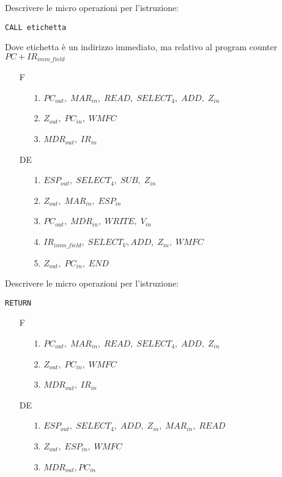 \documentclass[a4paper]{article}
\theoremstyle{break}
\theoremstyle{break}
\theoremstyle{break}
\theoremstyle{break}
\begin{document}
\begin{exercise}
	Descrivere le micro operazioni per l'istruzione:
	\begin{center}
		\texttt{CALL etichetta}
	\end{center}
	Dove etichetta è un indirizzo immediato, ma relativo al program counter
	\( PC + IR_{imm\_field} \)

	\begin{enumerate}
		\item[F]
		      \begin{enumerate}
			      \item[1.] \( PC_{out},\; MAR_{in},\; READ ,\; SELECT_4,\; ADD,\; Z_{in}\)
			      \item[2.] \( Z_{out},\; PC_{in},\;WMFC \)
			      \item[3.] \( MDR_{out},\; IR_{in} \)
		      \end{enumerate}

		\item [DE]
		      \begin{enumerate}
			      \item[1.] \( ESP_{out} ,\; SELECT_4 ,\; SUB,\; Z_{in} \)
			      \item[2.] \( Z_{out},\; MAR_{in} ,\; ESP_{in} \)
			      \item[3.] \( PC_{out} ,\; MDR_{in} ,\; WRITE ,\; V_{in}\)
			      \item[4.] \( IR_{imm\_field} ,\; SELECT_V, ADD ,\; Z_{in} ,\; WMFC \)
			      \item[5.] \( Z_{out} ,\; PC_{in} ,\; END\)
		      \end{enumerate}
	\end{enumerate}
\end{exercise}

\begin{exercise}
	Descrivere le micro operazioni per l'istruzione:
	\begin{center}
		\texttt{RETURN}
	\end{center}
	\begin{enumerate}
		\item[F]
		      \begin{enumerate}
			      \item[1.] \( PC_{out},\; MAR_{in},\; READ ,\; SELECT_4,\; ADD,\; Z_{in}\)
			      \item[2.] \( Z_{out},\; PC_{in},\;WMFC \)
			      \item[3.] \( MDR_{out},\; IR_{in} \)
		      \end{enumerate}

		\item [DE]
		      \begin{enumerate}
			      \item[1.] \( ESP_{out} ,\; SELECT_4 ,\; ADD,\; Z_{in},\; MAR_{in},\; READ \)
			      \item[3.] \( Z_{out},\; ESP_{in},\; WMFC \)
			      \item[3.] \( MDR_{out}, PC_{in} \)
		      \end{enumerate}
	\end{enumerate}
\end{exercise}
\end{document}
